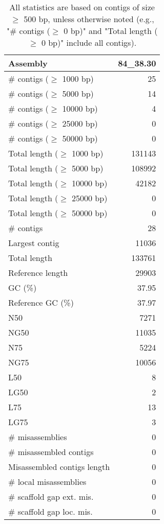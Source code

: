 \documentclass[12pt,a4paper]{article}
\begin{document}
\begin{table}[ht]
\begin{center}
\caption{All statistics are based on contigs of size $\geq$ 500 bp, unless otherwise noted (e.g., "\# contigs ($\geq$ 0 bp)" and "Total length ($\geq$ 0 bp)" include all contigs).}
\begin{tabular}{|l*{1}{|r}|}
\hline
Assembly & 84\_38.30 \\ \hline
\# contigs ($\geq$ 1000 bp) & 25 \\ \hline
\# contigs ($\geq$ 5000 bp) & 14 \\ \hline
\# contigs ($\geq$ 10000 bp) & 4 \\ \hline
\# contigs ($\geq$ 25000 bp) & 0 \\ \hline
\# contigs ($\geq$ 50000 bp) & 0 \\ \hline
Total length ($\geq$ 1000 bp) & 131143 \\ \hline
Total length ($\geq$ 5000 bp) & 108992 \\ \hline
Total length ($\geq$ 10000 bp) & 42182 \\ \hline
Total length ($\geq$ 25000 bp) & 0 \\ \hline
Total length ($\geq$ 50000 bp) & 0 \\ \hline
\# contigs & 28 \\ \hline
Largest contig & 11036 \\ \hline
Total length & 133761 \\ \hline
Reference length & 29903 \\ \hline
GC (\%) & 37.95 \\ \hline
Reference GC (\%) & 37.97 \\ \hline
N50 & 7271 \\ \hline
NG50 & 11035 \\ \hline
N75 & 5224 \\ \hline
NG75 & 10056 \\ \hline
L50 & 8 \\ \hline
LG50 & 2 \\ \hline
L75 & 13 \\ \hline
LG75 & 3 \\ \hline
\# misassemblies & 0 \\ \hline
\# misassembled contigs & 0 \\ \hline
Misassembled contigs length & 0 \\ \hline
\# local misassemblies & 0 \\ \hline
\# scaffold gap ext. mis. & 0 \\ \hline
\# scaffold gap loc. mis. & 0 \\ \hline

\end{tabular}
\end{center}
\end{table}
\end{document}
